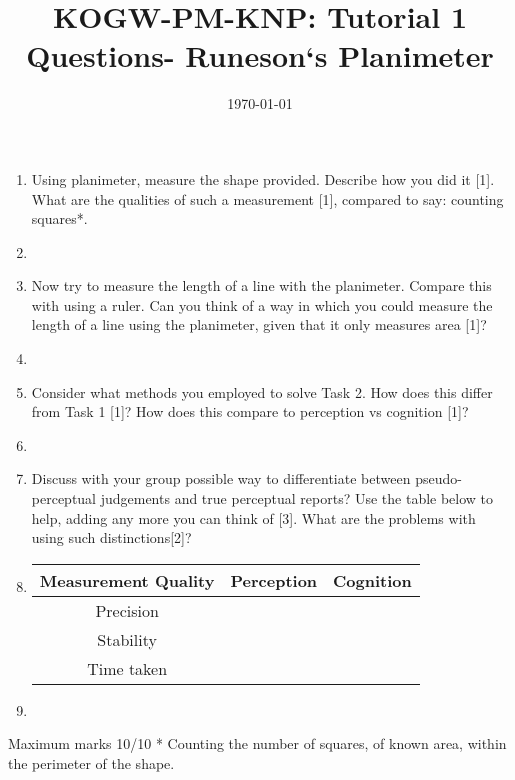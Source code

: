 \documentclass[12pt,english]{scrartcl}
\title{KOGW-PM-KNP: Tutorial 1 Questions- Runeson`s Planimeter}
\author{}
\date{\today}
\begin{document}
\maketitle

\begin{enumerate}
 \item Using planimeter, measure the shape provided. Describe how you did it [1]. What are the qualities of such a measurement [1], compared to say: counting squares*.
 \item[]
 \item Now try to measure the length of a line with the planimeter. Compare this with using a ruler. Can you think of a way in which you could measure the length of a line using the planimeter, given that it only measures area [1]?
 \item[]
 \item Consider what methods you employed to solve Task 2. How does this differ from Task 1 [1]? How does this compare to perception vs cognition [1]?
 \item[]
 \item Discuss with your group possible way to differentiate between pseudo-perceptual judgements and true perceptual reports? Use the table below to help, adding any more you can think of [3]. What are the problems with using such distinctions[2]?
 \item[]

  \begin{center}
   \begin{tabular}{ || c c c || } 
   \hline
   Measurement Quality & Perception & Cognition \\ 
   \hline
   Precision &  &  \\ 
   \hline
   Stability &  &   \\ 
   \hline
   Time taken  &  &  \\
   \hline
   \end{tabular}
  \end{center}
  \item[]

 \end{enumerate}

 Maximum marks 10/10
 * Counting the number of squares, of known area, within the perimeter of the shape.
\end{document}
